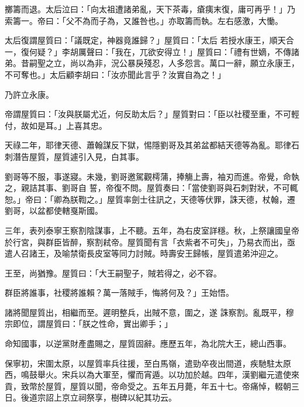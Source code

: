 \begin{pinyinscope}
 擲籌而退。太后泣曰：「向太祖遭諸弟亂，天下茶毒，瘡痍末復，庸可再乎！」乃索籌一。帝曰：「父不為而子為，又誰咎也。」亦取籌而執。左右感激，大慟。



 太后復謂屋質曰：「議既定，神器竟誰歸？」屋質曰：「太后
 若授水康王，順天合一，復何疑？」李胡厲聲曰：「我在，兀欲安得立！」屋質曰：「禮有世嫡，不傳諸弟。昔嗣聖之立，尚以為非，況公暴戾殘忍，人多怨言。萬口一辭，願立永康王，不可奪也。」太后顧李胡曰：「汝亦聞此言乎？汝實自為之！」



 乃許立永康。



 帝謂屋質曰：「汝與朕屬尤近，何反助太后？」屋質對曰：「臣以社稷至重，不可輕付，故如是耳。」上喜其忠。



 天祿二年，耶律天德、蕭翰謀反下獄，惕隱劉哥及其弟盆都結天德等為亂。耶律石刺潛告屋質，屋質遽引入見，白其事。



 劉哥等不服，事遂寢。未幾，劉哥邀駕觀樗蒲，捧觴上壽，袖刃而進。帝覺，命執之，親詰其事、劉哥自
 誓，帝復不問。屋質奏曰：「當使劉哥與石刺對狀，不可輒恕。」帝曰：「卿為朕鞫之。」屋質率劍士往訊之，天德等伏罪，誅天德，杖翰，遷劉哥，以盆都使轄戛斯國。



 三年，表列泰寧王察割陰謀事，上不聽。五年，為右皮室詳穩。秋，上祭讓國皇帝於行宮，與群臣皆醉，察割弒帝。屋質聞有言「衣紫者不可失」，乃易衣而出，亟遣人召諸王，及喻禁衛長皮室等同力討賊。時壽安王歸帳，屋質遣弟沖迎之。



 王至，尚猶豫。屋質曰：「大王嗣聖子，賊若得之，必不容。



 群臣將誰事，社稷將誰賴？萬一落賊手，悔將何及？」王始悟。



 諸將聞屋質出，相繼而至。遲明整兵，出賊不意，圍之，遂
 誅察割。亂既平，穆宗即位，謂屋質曰：「朕之性命，實出卿手；」



 命知國事，以逆黨財產盡賜之，屋質固辭。應歷五年，為北院大王，總山西事。



 保寧初，宋圍太原，以屋質率兵往援，至白馬嶺，遣勁卒夜出間道，疾馳駐太原西，鳴鼓舉火。宋兵以為大軍至，懼而宵遁。以功加於越。四年，漢劉繼元遣使來貢，致幣於屋質，屋質以聞，帝命受之。五年五月薨，年五十七。帝痛悼，輟朝三日。後道宗詔上京立祠祭享，樹碑以紀其功云。




\end{pinyinscope}
